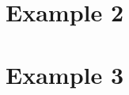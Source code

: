 \documentclass[8pt, xcolor={svgnames, x11names}]{beamer}
\begin{document}
\section{Example 2}


\section{Example 3}








\end{document}

